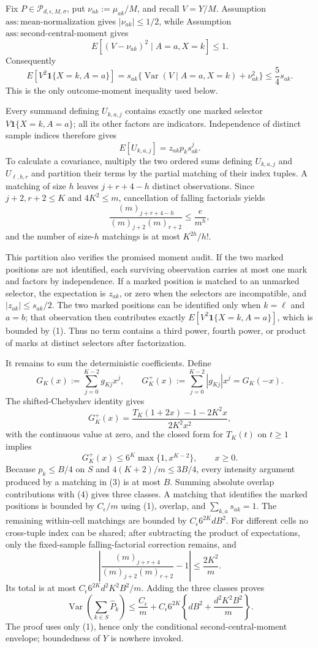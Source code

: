 Fix \(P\in\mathcal P_{d,\epsilon,M,\sigma}\), put \(\nu_{ak}:=\mu_{ak}/M\), and recall \(V=Y/M\).  Assumption~\(\mathrm{ass:mean\text{-}normalization}\) gives \(|\nu_{ak}|\le1/2\), while Assumption~\(\mathrm{ass:second\text{-}central\text{-}moment}\) gives
\[
 E[(V-\nu_{ak})^2\mid A=a,X=k]\le1.
\]
Consequently
\[
 E[V^2\mathbf 1\{X=k,A=a\}]
 =s_{ak}\{\operatorname{Var}(V\mid A=a,X=k)+\nu_{ak}^2\}
 \le\frac54s_{ak}.
\tag{1}
\]
This is the only outcome-moment inequality used below.

Every summand defining \(U_{k,a,j}\) contains exactly one marked selector
\(V\mathbf 1\{X=k,A=a\}\); all its other factors are indicators.  Independence of distinct sample indices therefore gives
\[
 E[U_{k,a,j}]=z_{ak}p_ks_{ak}^{j}.
\tag{2}
\]
To calculate a covariance, multiply the two ordered sums defining \(U_{k,a,j}\) and \(U_{\ell,b,r}\) and partition their terms by the partial matching of their index tuples.  A matching of size \(h\) leaves \(j+r+4-h\) distinct observations.  Since \(j+2,r+2\le K\) and \(4K^2\le m\), cancellation of falling factorials yields
\[
 \frac{(m)_{j+r+4-h}}{(m)_{j+2}(m)_{r+2}}
 \le\frac e{m^h},
\tag{3}
\]
and the number of size-\(h\) matchings is at most \(K^{2h}/h!\).

This partition also verifies the promised moment audit.  If the two marked positions are not identified, each surviving observation carries at most one mark and factors by independence.  If a marked position is matched to an unmarked selector, the expectation is \(z_{ak}\), or zero when the selectors are incompatible, and \(|z_{ak}|\le s_{ak}/2\).  The two marked positions can be identified only when \(k=\ell\) and \(a=b\); that observation then contributes exactly \(E[V^2\mathbf 1\{X=k,A=a\}]\), which is bounded by (1).  Thus no term contains a third power, fourth power, or product of marks at distinct selectors after factorization.

It remains to sum the deterministic coefficients.  Define
\[
 G_K(x):=\sum_{j=0}^{K-2}g_{Kj}x^j,
 \qquad G_K^+(x):=\sum_{j=0}^{K-2}|g_{Kj}|x^j=G_K(-x).
\]
The shifted-Chebyshev identity gives
\[
 G_K^+(x)=\frac{T_K(1+2x)-1-2K^2x}{2K^2x^2},
\]
with the continuous value at zero, and the closed form for \(T_K(t)\) on \(t\ge1\) implies
\[
 G_K^+(x)\le6^K\max\{1,x^{K-2}\},\qquad x\ge0.
\tag{4}
\]
Because \(p_k\le B/4\) on \(S\) and \(4(K+2)/m\le3B/4\), every intensity argument produced by a matching in (3) is at most \(B\).  Summing absolute overlap contributions with (4) gives three classes.  A matching that identifies the marked positions is bounded by \(C_\epsilon/m\) using (1), overlap, and \(\sum_{k,a}s_{ak}=1\).  The remaining within-cell matchings are bounded by \(C_\epsilon6^{2K}dB^2\).  For different cells no cross-tuple index can be shared; after subtracting the product of expectations, only the fixed-sample falling-factorial correction remains, and
\[
 \left|\frac{(m)_{j+r+4}}{(m)_{j+2}(m)_{r+2}}-1\right|
 \le\frac{2K^2}{m}.
\tag{5}
\]
Its total is at most \(C_\epsilon6^{2K}d^2K^2B^2/m\).  Adding the three classes proves
\[
 \operatorname{Var}\!\left(\sum_{k\in S}\widehat P_k\right)
 \le \frac{C_\epsilon}{m}+C_\epsilon6^{2K}
 \left\{dB^2+\frac{d^2K^2B^2}{m}\right\}.
\]
The proof uses only (1), hence only the conditional second-central-moment envelope; boundedness of \(Y\) is nowhere invoked.